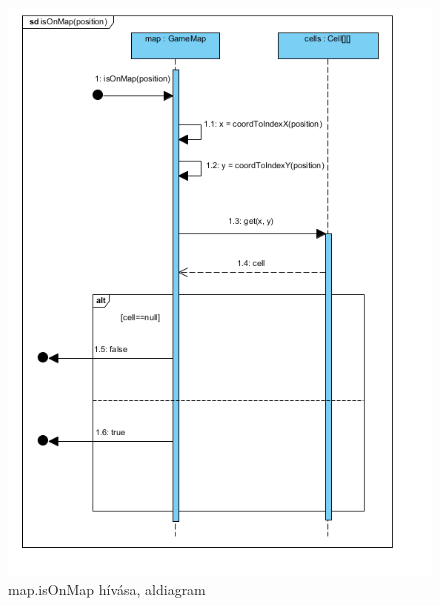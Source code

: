 \begin{figure}[!htbp]
	\begin{center}
		\includegraphics[width=\textwidth, center]{./chapters/chapter03/iom.png}
		\caption{map.isOnMap hívása, aldiagram}
	\end{center}
\end{figure}

